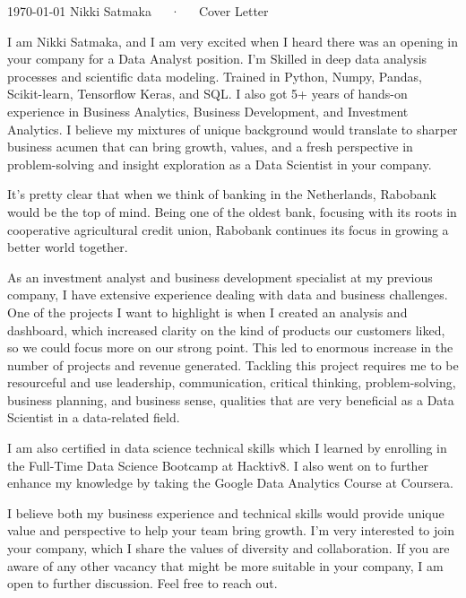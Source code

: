 \documentclass[11pt, a4paper]{awesome-cv}
\begin{document}
\makecvheader[R]

\makecvfooter
  {\today}
  {Nikki Satmaka~~~·~~~Cover Letter}
  {}

\makelettertitle

\begin{cvletter}

I am Nikki Satmaka, and I am very excited when I heard there was an opening in your company for a Data Analyst position. I'm Skilled in deep data analysis processes and scientific data modeling. Trained in Python, Numpy, Pandas, Scikit-learn, Tensorflow Keras, and SQL. I also got 5+ years of hands-on experience in Business Analytics, Business Development, and Investment Analytics. I believe my mixtures of unique background would translate to sharper business acumen that can bring growth, values, and a fresh perspective in problem-solving and insight exploration as a Data Scientist in your company.

It's pretty clear that when we think of banking in the Netherlands, Rabobank would be the top of mind. Being one of the oldest bank, focusing with its roots in cooperative agricultural credit union, Rabobank continues its focus in growing a better world together.

As an investment analyst and business development specialist at my previous company, I have extensive experience dealing with data and business challenges. One of the projects  I want to highlight is when I created an analysis and dashboard, which increased clarity on the kind of products our customers liked, so we could focus more on our strong point. This led to enormous increase in the number of projects and revenue generated. Tackling this project requires me to be resourceful and use leadership, communication, critical thinking, problem-solving, business planning, and business sense, qualities that are very beneficial as a Data Scientist in a data-related field.

I am also certified in data science technical skills which I learned by enrolling in the Full-Time Data Science Bootcamp at Hacktiv8. I also went on to further enhance my knowledge by taking the Google Data Analytics Course at Coursera.

I believe both my business experience and technical skills would provide unique value and perspective to help your team bring growth. I'm very interested to join your company, which I share the values of diversity and collaboration. If you are aware of any other vacancy that might be more suitable in your company, I am open to further discussion. Feel free to reach out.

\end{cvletter}


\makeletterclosing
\end{document}
